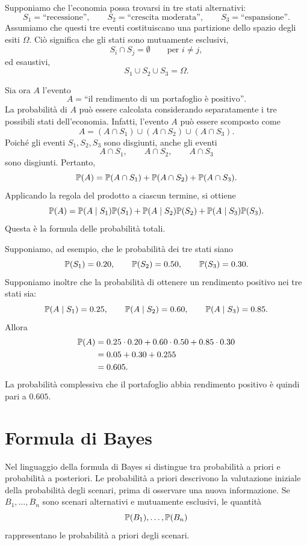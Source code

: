 \begin{example}
Supponiamo che l'economia possa trovarsi in tre stati alternativi:
\[
S_1=\text{``recessione''}, \qquad
S_2=\text{``crescita moderata''}, \qquad
S_3=\text{``espansione''}.
\]
Assumiamo che questi tre eventi costituiscano una partizione dello spazio degli esiti $\Omega$. 
Ci\`{o} significa che gli stati sono mutuamente esclusivi,
\[
S_i\cap S_j=\emptyset \qquad \text{per } i\neq j,
\]
ed esaustivi,
\[
S_1\cup S_2\cup S_3=\Omega.
\]

Sia ora $A$ l'evento
\[
A=\text{``il rendimento di un portafoglio \`{e} positivo''}.
\]
La probabilit\`{a} di $A$ pu\`{o} essere calcolata considerando separatamente i tre possibili stati dell'economia. 
Infatti, l'evento $A$ pu\`{o} essere scomposto come
\[
A=(A\cap S_1)\cup(A\cap S_2)\cup(A\cap S_3).
\]
Poich\'{e} gli eventi $S_1,S_2,S_3$ sono disgiunti, anche gli eventi
\[
A\cap S_1, \qquad A\cap S_2, \qquad A\cap S_3
\]
sono disgiunti. Pertanto,
\[
\mathbb{P}(A)
=
\mathbb{P}(A\cap S_1)
+
\mathbb{P}(A\cap S_2)
+
\mathbb{P}(A\cap S_3).
\]
Applicando la regola del prodotto a ciascun termine, si ottiene
\[
\mathbb{P}(A)
=
\mathbb{P}(A\mid S_1)\mathbb{P}(S_1)
+
\mathbb{P}(A\mid S_2)\mathbb{P}(S_2)
+
\mathbb{P}(A\mid S_3)\mathbb{P}(S_3).
\]
Questa \`{e} la formula delle probabilit\`{a} totali.

Supponiamo, ad esempio, che le probabilit\`{a} dei tre stati siano
\[
\mathbb{P}(S_1)=0.20, \qquad
\mathbb{P}(S_2)=0.50, \qquad
\mathbb{P}(S_3)=0.30.
\]
Supponiamo inoltre che la probabilit\`{a} di ottenere un rendimento positivo nei tre stati sia:
\[
\mathbb{P}(A\mid S_1)=0.25, \qquad
\mathbb{P}(A\mid S_2)=0.60, \qquad
\mathbb{P}(A\mid S_3)=0.85.
\]
Allora
\[
\begin{aligned}
\mathbb{P}(A)
&=
0.25\cdot 0.20
+
0.60\cdot 0.50
+
0.85\cdot 0.30 \\
&=
0.05+0.30+0.255 \\
&=
0.605.
\end{aligned}
\]
La probabilit\`{a} complessiva che il portafoglio abbia rendimento positivo \`{e} quindi pari a $0.605$.
\end{example}

\section{Formula di Bayes}

Nel linguaggio della formula di Bayes si distingue tra probabilit\`{a} a priori e
probabilit\`{a} a posteriori. Le probabilit\`{a} a priori descrivono la
valutazione iniziale della probabilit\`{a} degli scenari, prima di osservare una
nuova informazione. Se $B_1,\ldots,B_n$ sono scenari alternativi e mutuamente
esclusivi, le quantit\`{a}
\[
\mathbb{P}(B_1),\ldots,\mathbb{P}(B_n)
\]
rappresentano le probabilit\`{a} a priori degli scenari.

